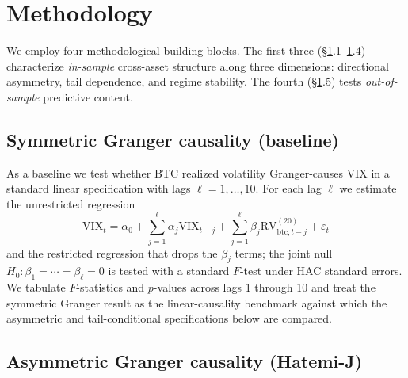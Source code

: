 \documentclass[11pt,a4paper]{article}
\begin{document}
\section{Methodology}
\label{sec:methodology}

We employ four methodological building blocks. The first three (\S\ref{sec:methodology}.1--\ref{sec:methodology}.4) characterize \emph{in-sample} cross-asset structure along three dimensions: directional asymmetry, tail dependence, and regime stability. The fourth (\S\ref{sec:methodology}.5) tests \emph{out-of-sample} predictive content.

\subsection{Symmetric Granger causality (baseline)}
\label{subsec:granger_sym}

As a baseline we test whether BTC realized volatility Granger-causes VIX in a standard linear specification with lags $\ell = 1, \ldots, 10$. For each lag $\ell$ we estimate the unrestricted regression
\begin{equation}
\text{VIX}_t = \alpha_0 + \sum_{j=1}^{\ell} \alpha_j \text{VIX}_{t-j} + \sum_{j=1}^{\ell} \beta_j \text{RV}^{(20)}_{\text{btc}, t-j} + \varepsilon_t
\label{eq:granger_unrestricted}
\end{equation}
and the restricted regression that drops the $\beta_j$ terms; the joint null $H_0: \beta_1 = \cdots = \beta_\ell = 0$ is tested with a standard $F$-test under HAC standard errors. We tabulate $F$-statistics and $p$-values across lags 1 through 10 and treat the symmetric Granger result as the linear-causality benchmark against which the asymmetric and tail-conditional specifications below are compared.

\subsection{Asymmetric Granger causality (Hatemi-J)}
\label{subsec:granger_asym}
\end{document}
